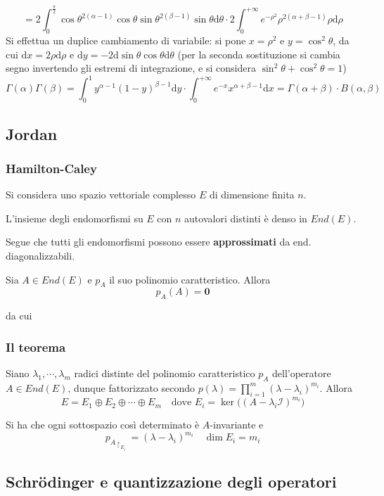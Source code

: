 \documentclass[10pt]{article}
\theoremstyle{plain}
\begin{document}
\[= 2 \int_0^{\frac{\pi}{2}} \cos \theta^{2(\alpha - 1)} \cos \theta \sin \theta ^{2(\beta -1)} \sin \theta \textrm{d}\theta \cdot 2 \int_0^{+\infty} e^{-\rho^2} \rho^{2(\alpha + \beta -1)}\rho  \textrm{d}\rho\]
Si effettua un duplice cambiamento di variabile: si pone $x = \rho^2$ e $y = \cos^2\theta$, da cui $ \textrm{d}x = 2\rho  \textrm{d}\rho$ e $ \textrm{d}y = - 2  \textrm{d} \sin \theta \cos \theta  \textrm{d}\theta$ (per la seconda sostituzione si cambia segno invertendo gli estremi di integrazione, e si considera $\sin^2\theta + \cos^2\theta = 1$)
\[\Gamma(\alpha)\Gamma(\beta) = \int_0^1 y^{\alpha - 1} (1-y)^{\beta - 1}\textrm{d}y \cdot \int_0^{+\infty} e^{-x} x^{\alpha + \beta -1}\textrm{d}x = \Gamma(\alpha + \beta) \cdot B(\alpha, \beta)\]

\subsection{Jordan}
\subsubsection{Hamilton-Caley}
Si considera uno spazio vettoriale complesso $E$ di dimensione finita $n$. 
\begin{lem}
L'insieme degli endomorfismi su $E$ con $n$ autovalori distinti è denso in $End(E)$.
\end{lem}
Segue che tutti gli endomorfismi possono essere \textbf{approssimati} da end. diagonalizzabili.
\begin{ther}[di H.-C.]
Sia $A \in End(E)$ e $p_A$ il suo polinomio caratteristico. Allora 
\[p_A(A) = \mathbf{0}\]
\end{ther}
da cui
\subsubsection{Il teorema}
\begin{ther}
Siano $\lambda_1, \cdots, \lambda_m$ radici distinte del polinomio caratteristico $p_A$ dell'operatore $A \in End(E)$, dunque fattorizzato secondo $\displaystyle p(\lambda) = \prod\limits_{i=1}^m (\lambda - \lambda_i)^{m_i}$. Allora
\[E = E_1 \oplus E_2 \oplus \cdots \oplus E_m \quad \textrm{dove } E_i = \ker\big((A - \lambda_i \mathcal{I})^{m_i}\big)\]
\end{ther}
Si ha che ogni sottospazio così determinato è $A$-invariante e 
\[p_{\displaystyle A\restriction_{E_i}} = (\lambda - \lambda_i)^{m_i} \quad \dim E_i = m_i\]


\subsection{Schr\"odinger e quantizzazione degli operatori}
\end{document}
